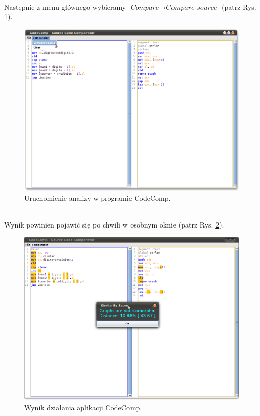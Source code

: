 \documentclass[a4paper,12pt]{article}
\begin{document}
\pagebreak
\\
Następnie z menu głównego wybieramy $\textit{Compare} \rightarrow \textit{Compare source}$ (patrz Rys. \ref{fig:compare}).
\begin{figure}[here]
\centering
\includegraphics[scale=0.3]{gfx/compare_source.png}
\caption{Uruchomienie analizy w programie CodeComp.}
\label{fig:compare}
\end{figure}
\\
Wynik powinien pojawić się po chwili w osobnym oknie (patrz Rys. \ref{fig:score}).
\begin{figure}[!]
\centering
\includegraphics[scale=0.3]{gfx/compare_score.png}
\caption{Wynik działania aplikacji CodeComp.}
\label{fig:score}
\end{figure}
\end{document}
